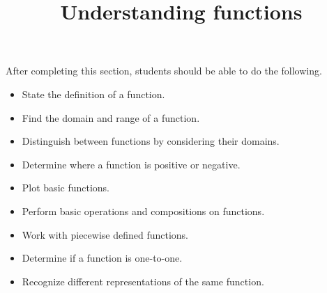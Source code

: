 \documentclass{ximera}
\title{Understanding functions}
\begin{document}
\begin{abstract} 
\end{abstract}

\maketitle

\begin{sectionOutcomes}
After completing this section, students should be able to do the following.

\begin{itemize}
	\item State the definition of a function.
	\item Find the domain and range of a function.
	\item Distinguish between functions by considering their domains.
	\item Determine where a function is positive or negative.
	\item Plot basic functions.
        \item Perform basic operations and compositions on
          functions.
        \item Work with piecewise defined functions.
	\item Determine if a function is one-to-one.
	\item Recognize different representations of the same function.
\end{itemize}
\end{sectionOutcomes}
\end{document}

